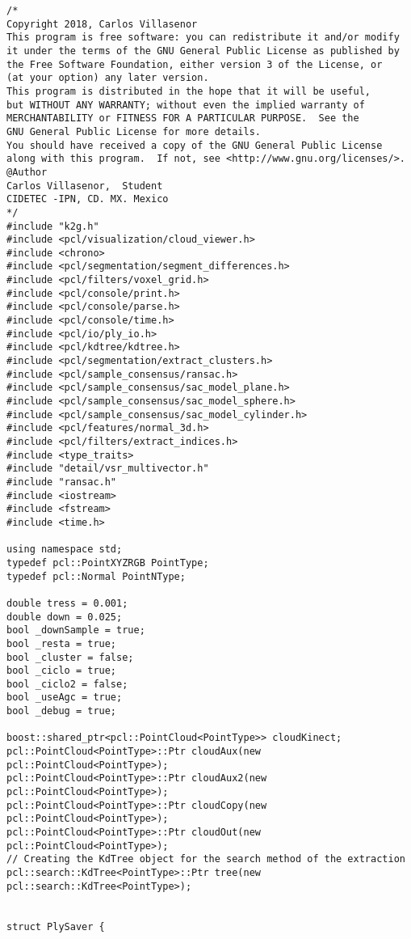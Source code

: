 {\fontsize{7.5}{10} \selectfont
	\label{code:Main}
	\begin{lstlisting}[caption={Archivo test.cpp}]
/*
Copyright 2018, Carlos Villasenor
This program is free software: you can redistribute it and/or modify
it under the terms of the GNU General Public License as published by
the Free Software Foundation, either version 3 of the License, or
(at your option) any later version.
This program is distributed in the hope that it will be useful,
but WITHOUT ANY WARRANTY; without even the implied warranty of
MERCHANTABILITY or FITNESS FOR A PARTICULAR PURPOSE.  See the
GNU General Public License for more details.
You should have received a copy of the GNU General Public License
along with this program.  If not, see <http://www.gnu.org/licenses/>.
@Author
Carlos Villasenor,  Student
CIDETEC -IPN, CD. MX. Mexico
*/
#include "k2g.h"
#include <pcl/visualization/cloud_viewer.h>
#include <chrono>
#include <pcl/segmentation/segment_differences.h>
#include <pcl/filters/voxel_grid.h>
#include <pcl/console/print.h>
#include <pcl/console/parse.h>
#include <pcl/console/time.h>
#include <pcl/io/ply_io.h>
#include <pcl/kdtree/kdtree.h>
#include <pcl/segmentation/extract_clusters.h>
#include <pcl/sample_consensus/ransac.h>
#include <pcl/sample_consensus/sac_model_plane.h>
#include <pcl/sample_consensus/sac_model_sphere.h>
#include <pcl/sample_consensus/sac_model_cylinder.h>
#include <pcl/features/normal_3d.h>
#include <pcl/filters/extract_indices.h>
#include <type_traits>
#include "detail/vsr_multivector.h"
#include "ransac.h"
#include <iostream>
#include <fstream>
#include <time.h>

using namespace std;
typedef pcl::PointXYZRGB PointType;
typedef pcl::Normal PointNType;

double tress = 0.001;
double down = 0.025;
bool _downSample = true;
bool _resta = true;
bool _cluster = false;
bool _ciclo = true;
bool _ciclo2 = false;
bool _useAgc = true;
bool _debug = true;

boost::shared_ptr<pcl::PointCloud<PointType>> cloudKinect;
pcl::PointCloud<PointType>::Ptr cloudAux(new pcl::PointCloud<PointType>);
pcl::PointCloud<PointType>::Ptr cloudAux2(new pcl::PointCloud<PointType>);
pcl::PointCloud<PointType>::Ptr cloudCopy(new pcl::PointCloud<PointType>);
pcl::PointCloud<PointType>::Ptr cloudOut(new pcl::PointCloud<PointType>);
// Creating the KdTree object for the search method of the extraction
pcl::search::KdTree<PointType>::Ptr tree(new pcl::search::KdTree<PointType>);


struct PlySaver {



\end{lstlisting}}
